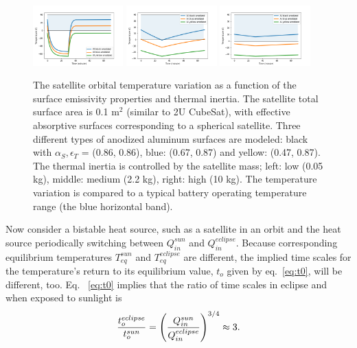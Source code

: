 \documentclass[]{aastex62}
\def\eq#1{\begin{equation} #1 \end{equation}}
\begin{document}
\begin{figure}[t]
\centering
\includegraphics[width=0.31\textwidth, keepaspectratio]{figures/3tempsVStime_DefaultsMassVariationMsmall.png}
\includegraphics[width=0.31\textwidth, keepaspectratio]{figures/3tempsVStime_DefaultsMassVariationMdefault.png}
\includegraphics[width=0.31\textwidth, keepaspectratio]{figures/3tempsVStime_DefaultsMassVariationMlarge.png}
\caption{The satellite orbital temperature variation as a function of the surface emissivity properties 
and thermal inertia. The satellite total surface area is 0.1 m$^2$ (similar to 2U CubeSat), with 
effective absorptive surfaces corresponding to a spherical satellite. Three different types of anodized 
aluminum surfaces are modeled: black with $\alpha_S, \epsilon_T$  = (0.86, 0.86), blue: (0.67, 0.87)  
and yellow: (0.47, 0.87).  The thermal inertia is controlled by the satellite mass; left: low (0.05 kg), 
middle: medium (2.2 kg), right: high (10 kg). The temperature variation is compared to a typical battery operating 
temperature range (the blue horizontal band).  
\label{fig:Tt}}
\end{figure}


Now consider a bistable heat source, such as a satellite in an orbit and the heat source periodically
switching between $Q_{in}^{sun}$ and $Q_{in}^{eclipse}$. Because corresponding equilibrium temperatures 
$T_{eq}^{sun}$ and $T_{eq}^{eclipse}$ are different, the implied time scales for the temperature's return to its
equilibrium value, $t_o$ given by eq.~\ref{eq:t0}, will be different, too. Eq. ~\ref{eq:t0} implies that
the ratio of time scales in eclipse and when exposed to sunlight is 
\eq{
  { t_o^{eclipse} \over t_o^{sun} }= \left(Q_{in}^{sun} \over Q_{in}^{eclipse} \right)^{3/4} \approx 3. 
}
\end{document}

